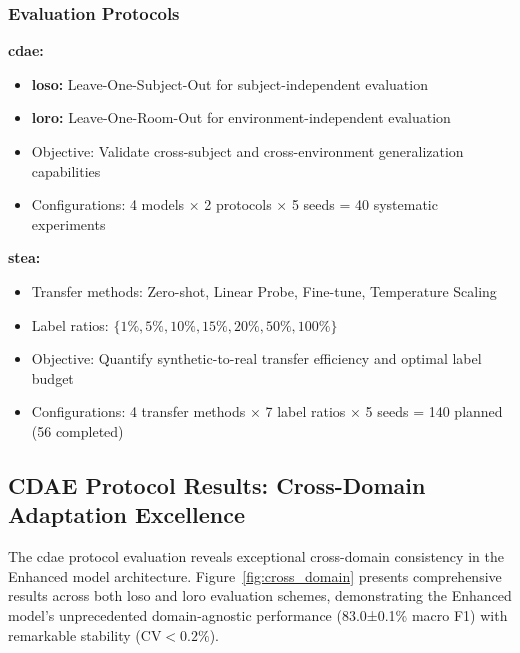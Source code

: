 \documentclass[journal]{IEEEtran}
\begin{document}
\subsubsection{Evaluation Protocols}

\textbf{\gls{cdae}:}
\begin{itemize}
\item \textbf{\gls{loso}:} Leave-One-Subject-Out for subject-independent evaluation
\item \textbf{\gls{loro}:} Leave-One-Room-Out for environment-independent evaluation
\item Objective: Validate cross-subject and cross-environment generalization capabilities
\item Configurations: 4 models × 2 protocols × 5 seeds = 40 systematic experiments
\end{itemize}

\textbf{\gls{stea}:}
\begin{itemize}
\item Transfer methods: Zero-shot, Linear Probe, Fine-tune, Temperature Scaling
\item Label ratios: $\{1\%, 5\%, 10\%, 15\%, 20\%, 50\%, 100\%\}$
\item Objective: Quantify synthetic-to-real transfer efficiency and optimal label budget
\item Configurations: 4 transfer methods × 7 label ratios × 5 seeds = 140 planned (56 completed)
\end{itemize}

\subsection{CDAE Protocol Results: Cross-Domain Adaptation Excellence}

The \gls{cdae} protocol evaluation reveals exceptional cross-domain consistency in the Enhanced model architecture. Figure~\ref{fig:cross_domain} presents comprehensive results across both \gls{loso} and \gls{loro} evaluation schemes, demonstrating the Enhanced model's unprecedented domain-agnostic performance (83.0±0.1\% macro F1) with remarkable stability ($\text{CV}<0.2\%$).
\end{document}
